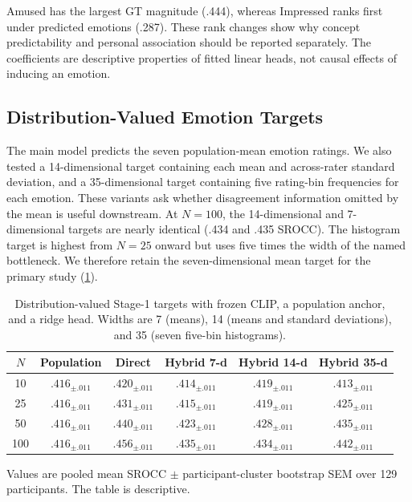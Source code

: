 \documentclass[10pt,twocolumn,letterpaper]{article}
\begin{document}
Amused has the largest GT magnitude (.444), whereas Impressed ranks first
under predicted emotions (.287). These rank changes show why concept
predictability and personal association should be reported separately. The
coefficients are descriptive properties of fitted linear heads, not causal
effects of inducing an emotion.

\subsection{Distribution-Valued Emotion Targets}

The main model predicts the seven population-mean emotion ratings. We also
tested a 14-dimensional target containing each mean and across-rater standard
deviation, and a 35-dimensional target containing five rating-bin frequencies
for each emotion. 
These variants ask whether disagreement information omitted by the mean is useful downstream. 
At $N=100$, the 14-dimensional and 7-dimensional targets are nearly identical (.434 and .435 SROCC). 
The histogram target is highest from $N=25$ onward but uses five times the width of the named bottleneck. We therefore retain the seven-dimensional mean target for the primary study
(\cref{tab:distribution}).

\begin{table}[!tbp]
\centering
\begin{threeparttable}
\caption{Distribution-valued Stage-1 targets with frozen CLIP, a population
anchor, and a ridge head. Widths are 7 (means), 14 (means and standard
deviations), and 35 (seven five-bin histograms).}
\label{tab:distribution}
\small
\setlength{\tabcolsep}{4pt}
    \begin{tabular}{@{}c cc ccc@{}}
    \toprule
    $N$ & Population & Direct & Hybrid 7-d & Hybrid 14-d & Hybrid 35-d \\
    \midrule
    10 & $.416_{\pm .011}$ & $.420_{\pm .011}$ & $.414_{\pm .011}$ & $.419_{\pm .011}$ & $.413_{\pm .011}$ \\
    25 & $.416_{\pm .011}$ & $.431_{\pm .011}$ & $.415_{\pm .011}$ & $.419_{\pm .011}$ & $.425_{\pm .011}$ \\
    50 & $.416_{\pm .011}$ & $.440_{\pm .011}$ & $.423_{\pm .011}$ & $.428_{\pm .011}$ & $.435_{\pm .011}$ \\
    100 & $.416_{\pm .011}$ & $.456_{\pm .011}$ & $.435_{\pm .011}$ & $.434_{\pm .011}$ & $.442_{\pm .011}$ \\
    \bottomrule
    \end{tabular}
\begin{tablenotes}[flushleft]\footnotesize
    \item Values are pooled mean SROCC $\pm$ participant-cluster bootstrap SEM
    over 129 participants. The table is descriptive.
\end{tablenotes}
\end{threeparttable}
\end{table}
\end{document}
